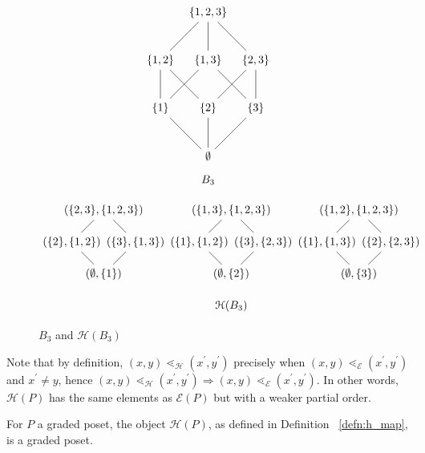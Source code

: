 \documentclass[smallextended, envcountsame, numbook]{svjour3}
\numberwithin{equation}{section}
\begin{document}
\begin{figure}[h!]
\[\begin{tikzpicture}[scale = 1.5]
  \node (0) at (0,0) {$\emptyset$};
  \node (1) at (-1,1) {$\{1\}$};
  \node (2) at (0,1) {$\{2\}$};
  \node (3) at (1,1) {$\{3\}$};
  \node (4) at (-1,2) {$\{1,2\}$};
  \node (5) at (0,2) {$\{1,3\}$};
  \node (6) at (1,2) {$\{2,3\}$};
  \node (7) at (0,3) {$\{1,2,3\}$};
  \draw (0)--(1);
  \draw (0)--(2);
  \draw (0)--(3);
  \draw (1)--(4);
  \draw (1)--(5);
  \draw (2)--(4);
  \draw (2)--(6);
  \draw (3)--(5);
  \draw (3)--(6);
  \draw (4)--(7);
  \draw (5)--(7);
  \draw (6)--(7);
  \node (8) at (0,-.5) {$B_3$};
\end{tikzpicture} \]

\vspace*{0.3in}

\[\begin{tikzpicture}[scale = 1]
  \node (0) at (0,0) {$(\emptyset,\{1\})$};
  \node (1) at (4,0) {$(\emptyset,\{2\})$};
  \node (2) at (8,0) {$(\emptyset,\{3\})$};
  \node (3) at (3,1) {$(\{1\},\{1,2\})$};
  \node (4) at (7,1) {$(\{1\},\{1,3\})$};
  \node (5) at (-1,1) {$(\{2\},\{1,2\})$};
  \node (6) at (9,1) {$(\{2\},\{2,3\})$};
  \node (7) at (1,1) {$(\{3\},\{1,3\})$};
  \node (8) at (5,1) {$(\{3\},\{2,3\})$};
  \node (9) at (8,2) {$(\{1,2\},\{1,2,3\})$};
  \node (10) at (4,2) {$(\{1,3\},\{1,2,3\})$};
  \node (11) at (0,2) {$(\{2,3\},\{1,2,3\})$};
  \draw (0)--(5)--(11)--(7)--(0);
  \draw (1)--(3)--(10)--(8)--(1);
  \draw (2)--(4)--(9)--(6)--(2);
  \node (12) at (4,-1) {$\mathcal{H}(B_3)$};
\end{tikzpicture}\]
\caption{\label{fig:3boolean} $B_3$ and $\mathcal H (B_3)$}
\end{figure}


\begin{remark}\label{rem:order_containment}
Note that by definition, $(x,y)\lessdot_{\mathcal{H}} (x^\prime,y^\prime)$ precisely when $(x,y)\lessdot_{\mathcal{E}} (x^\prime,y^\prime)$ and $x^\prime\neq y$, hence $(x, y)\lessdot_{\mathcal{H}} (x^\prime, y^\prime) \Rightarrow (x, y)\lessdot_{\mathcal E} (x^\prime, y^\prime)$.  In other words, $\mathcal{H}(P)$ has the same elements as $\mathcal{E}(P)$ but with a weaker partial order.
\end{remark}


\begin{lemma}\label{lem:HP_order}
For $P$ a graded poset, the object $\mathcal{H}(P)$, as defined in Definition ~\ref{defn:h_map}, is a graded poset.
\end{lemma}
\end{document}
